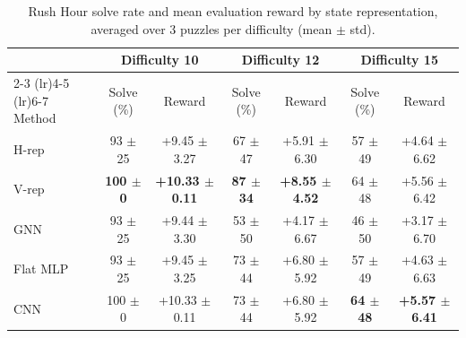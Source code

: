 \begin{table}[t]
\centering
\caption{Rush Hour solve rate and mean evaluation reward by state representation, averaged over 3 puzzles per difficulty (mean $\pm$ std).}
\label{tab:rush-hour-results}
\begin{tabular}{lcccccc}
\toprule
 & \multicolumn{2}{c}{Difficulty 10} & \multicolumn{2}{c}{Difficulty 12} & \multicolumn{2}{c}{Difficulty 15} \\
\cmidrule(lr){2-3} \cmidrule(lr){4-5} \cmidrule(lr){6-7}
Method & Solve (\%) & Reward & Solve (\%) & Reward & Solve (\%) & Reward \\
\midrule
H-rep & 93 $\pm$ 25 & +9.45 $\pm$ 3.27 & 67 $\pm$ 47 & +5.91 $\pm$ 6.30 & 57 $\pm$ 49 & +4.64 $\pm$ 6.62 \\
V-rep & \textbf{100 $\pm$ 0} & \textbf{+10.33 $\pm$ 0.11} & \textbf{87 $\pm$ 34} & \textbf{+8.55 $\pm$ 4.52} & 64 $\pm$ 48 & +5.56 $\pm$ 6.42 \\
GNN & 93 $\pm$ 25 & +9.44 $\pm$ 3.30 & 53 $\pm$ 50 & +4.17 $\pm$ 6.67 & 46 $\pm$ 50 & +3.17 $\pm$ 6.70 \\
Flat MLP & 93 $\pm$ 25 & +9.45 $\pm$ 3.25 & 73 $\pm$ 44 & +6.80 $\pm$ 5.92 & 57 $\pm$ 49 & +4.63 $\pm$ 6.63 \\
CNN & 100 $\pm$ 0 & +10.33 $\pm$ 0.11 & 73 $\pm$ 44 & +6.80 $\pm$ 5.92 & \textbf{64 $\pm$ 48} & \textbf{+5.57 $\pm$ 6.41} \\
\bottomrule
\end{tabular}
\end{table}
